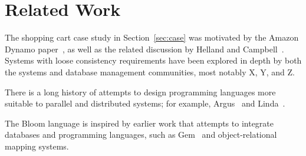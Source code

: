 \section{Related Work}
\label{sec:relwork}
The shopping cart case study in Section~\ref{sec:case} was motivated by the
Amazon Dynamo paper~\cite{dynamo}, as well as the related discussion by Helland
and Campbell~\cite{quicksand}. Systems with loose consistency requirements have
been explored in depth by both the systems and database management communities,
most notably X, Y, and Z.

There is a long history of attempts to design programming languages more
suitable to parallel and distributed systems; for example, Argus~\cite{argus}
and Linda~\cite{linda}.

The Bloom language is inspired by earlier work that attempts to integrate
databases and programming languages, such as Gem~\cite{gem} and
object-relational mapping systems.
